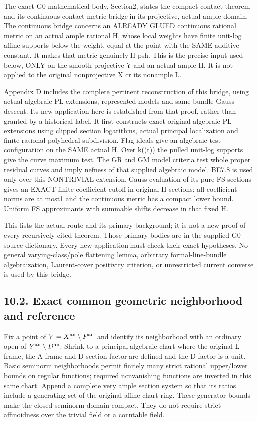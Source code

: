 \documentclass[
  10pt,
]{article}
\begin{document}
The exact G0 mathematical body, Section2, states the compact contact
theorem and its continuous contact metric bridge in its projective,
actual-ample domain. The continuous bridge concerns an ALREADY GLUED
continuous rational metric on an actual ample rational H, whose local
weights have finite unit-log affine supports below the weight, equal at
the point with the SAME additive constant. It makes that metric
genuinely H-psh. This is the precise input used below, ONLY on the
smooth projective Y and an actual ample H. It is not applied to the
original nonprojective X or its nonample L.

Appendix D includes the complete pertinent reconstruction of this
bridge, using actual algebraic PL extensions, represented models and
same-bundle Gauss descent. Its new application here is established from
that proof, rather than granted by a historical label. It first
constructs exact original algebraic PL extensions using clipped section
logarithms, actual principal localization and finite rational polyhedral
subdivision. Flag ideals give an algebraic test configuration on the
SAME actual H. Over k((t)) the pulled unit-log supports give the curve
maximum test. The GR and GM model criteria test whole proper residual
curves and imply nefness of that supplied algebraic model. BE7.8 is used
only over this NONTRIVIAL extension. Gauss evaluation of its pure FS
sections gives an EXACT finite coefficient cutoff in original H
sections: all coefficient norms are at most1 and the continuous metric
has a compact lower bound. Uniform FS approximants with summable shifts
decrease in that fixed H.

This lists the actual route and its primary background; it is not a new
proof of every recursively cited theorem. Those primary bodies are in
the supplied G0 source dictionary. Every new application must check
their exact hypotheses. No general varying-class/pole flattening lemma,
arbitrary formal-line-bundle algebraization, Laurent-cover positivity
criterion, or unrestricted current converse is used by this bridge.

\subsection{10.2. Exact common geometric neighborhood and
reference}\label{exact-common-geometric-neighborhood-and-reference}

Fix a point of \(V=X^{\rm an}\setminus P^{\rm an}\) and identify its
neighborhood with an ordinary open of
\(Y^{\rm an}\setminus D^{\rm an}\). Shrink to a principal algebraic
chart where the original L frame, the A frame and D section factor are
defined and the D factor is a unit. Basic seminorm neighborhoods permit
finitely many strict rational upper/lower bounds on regular functions;
required nonvanishing functions are inverted in this same chart. Append
a complete very ample section system so that its ratios include a
generating set of the original affine chart ring. These generator bounds
make the closed seminorm domain compact. They do not require strict
affinoidness over the trivial field or a countable field.
\end{document}
